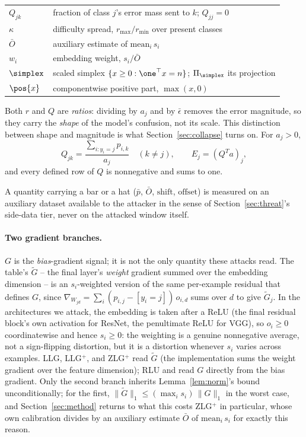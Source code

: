 \begin{center}
\begin{tabular}{@{}l p{}@{}}
$Q_{jk}$ & fraction of class $j$'s error mass sent to $k$; $Q_{jj}=0$ \\
$\kappa$ & difficulty spread, $r_{\max}/r_{\min}$ over present classes \\
\midrule
$\bar O$ & auxiliary estimate of $\mathrm{mean}_i\,s_i$ \\
$w_i$ & embedding weight, $s_i/\bar O$ \\
$\simplex$ & scaled simplex $\{x \ge 0 : \one^\top x = n\}$; $\Pi_\simplex$ its projection \\
$\pos{x}$ & componentwise positive part, $\max(x,0)$ \\
\bottomrule
\end{tabular}
\end{center}

Both $r$ and $Q$ are \emph{ratios}: dividing by $a_j$ and by $\bar\epsilon$
removes the error magnitude, so they carry the \emph{shape} of the model's
confusion, not its scale. This distinction between shape and magnitude is
what Section~\ref{sec:collapse} turns on. For $a_j>0$,
\[
 Q_{jk} = \frac{\sum_{i:y_i=j} p_{i,k}}{a_j}\quad (k\ne j),
 \qquad E_j = (Q^Ta)_j ,
\]
and every defined row of $Q$ is nonnegative and sums to one.

A quantity carrying a bar or a hat ($\bar p$, $\bar O$, $\mathrm{shift}$,
$\mathrm{offset}$) is measured on an auxiliary dataset available to the
attacker in the sense of Section~\ref{sec:threat}'s side-data tier, never
on the attacked window itself.

\paragraph{Two gradient branches.}
$G$ is the \emph{bias}-gradient signal; it is not the only quantity these
attacks read. The table's $\widetilde G$ -- the final layer's \emph{weight}
gradient summed over the embedding dimension -- is an $s_i$-weighted
version of the same per-example residual that defines $G$, since
$\nabla_{W_{jd}} = \sum_i (p_{i,j}-[y_i{=}j])\,o_{i,d}$ sums over $d$ to
give $\widetilde G_j$. In the architectures we attack, the embedding is taken after a ReLU
(the final residual block's own activation for ResNet, the penultimate
ReLU for VGG), so $o_i \ge 0$ coordinatewise and hence $s_i \ge 0$: the
weighting is a genuine nonnegative average, not a sign-flipping
distortion, but it is a distortion whenever $s_i$ varies across examples.
LLG, LLG$^+$, and ZLG$^+$ read $\widetilde G$ (the implementation sums the
weight gradient over the feature dimension); RLU and \ourmethod{} read
$G$ directly from the bias gradient. Only the second branch inherits
Lemma~\ref{lem:norm}'s bound unconditionally; for the first,
$\|\widetilde G\|_1 \le (\max_i s_i)\,\|G\|_1$ in the worst case, and
Section~\ref{sec:method} returns to what this costs ZLG$^+$ in
particular, whose own calibration divides by an auxiliary estimate
$\bar O$ of $\mathrm{mean}_i\, s_i$ for exactly this reason.

